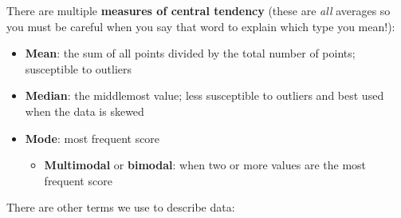 \documentclass[
]{book}
\providecommand{\tightlist}{%
  \setlength{\itemsep}{0pt}\setlength{\parskip}{0pt}}
\begin{document}
There are multiple \textbf{measures of central tendency} (these are \emph{all} averages so you must be careful when you say that word to explain which type you mean!):

\begin{itemize}
\item
  \textbf{Mean}: the sum of all points divided by the total number of points; susceptible to outliers
\item
  \textbf{Median}: the middlemost value; less susceptible to outliers and best used when the data is skewed
\item
  \textbf{Mode}: most frequent score

  \begin{itemize}
  \tightlist
  \item
    \textbf{Multimodal} or \textbf{bimodal}: when two or more values are the most frequent score
  \end{itemize}
\end{itemize}

There are other terms we use to describe data:
\end{document}
